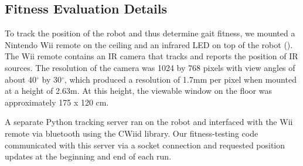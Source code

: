 \subsection{Fitness Evaluation Details}

%
%
%
%
%
%



To track the position of the robot and thus determine gait fitness, we
mounted a Nintendo Wii remote on the ceiling and an infrared LED on
top of the robot ().  The Wii remote contains
an IR camera that tracks and reports the position of IR sources.  The
resolution of the camera was 1024 by 768 pixels with view angles of
about 40$^\circ$ by 30$^\circ$, which produced a resolution of 1.7mm
per pixel when mounted at a height of 2.63m.  At this height, the
viewable window on the floor was approximately 175 x 120 cm.

A separate Python tracking server ran on the robot and
interfaced with the Wii remote via bluetooth using the CWiid
library.  Our fitness-testing code communicated with this
server via a socket connection and requested position updates at the
beginning and end of each run.


